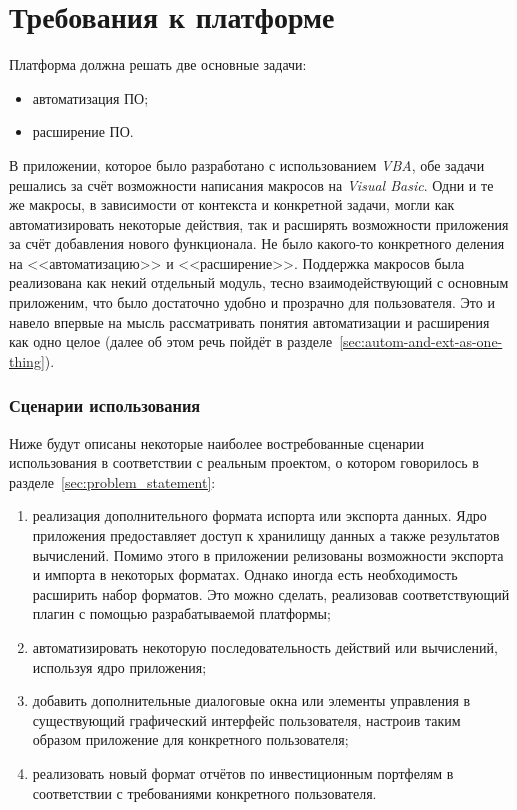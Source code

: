 \section{Требования к платформе}

Платформа должна решать две основные задачи:
\begin{itemize}
 \item автоматизация ПО;
 \item расширение ПО.
\end{itemize}

В приложении, которое было разработано с использованием {\it VBA}, обе задачи решались за счёт возможности написания макросов на {\it Visual Basic}. Одни и те же макросы, в зависимости от контекста и конкретной задачи, могли как автоматизировать некоторые действия, так и расширять возможности приложения за счёт добавления нового функционала. Не было какого-то конкретного деления на <<автоматизацию>> и <<расширение>>. Поддержка макросов была реализована как некий отдельный модуль, тесно взаимодействующий с основным приложеним, что было достаточно удобно и прозрачно для пользователя. Это и навело впервые на мысль рассматривать понятия автоматизации и расширения как одно целое (далее об этом речь пойдёт в разделе~\ref{sec:autom-and-ext-as-one-thing}).

\subsubsection{Сценарии использования}
Ниже будут описаны некоторые наиболее востребованные сценарии использования в соответствии с реальным проектом, о котором говорилось в разделе~\ref{sec:problem_statement}:
\begin{enumerate}
 \item реализация дополнительного формата испорта или экспорта данных. Ядро приложения предоставляет доступ к хранилищу данных а также результатов вычислений. Помимо этого в приложении релизованы возможности экспорта и импорта в некоторых форматах. Однако иногда есть необходимость расширить набор форматов. Это можно сделать, реализовав соответствующий плагин с помощью разрабатываемой платформы;
 \item автоматизировать некоторую последовательность действий или вычислений, используя ядро приложения;
 \item добавить дополнительные диалоговые окна или элементы управления в существующий графический интерфейс пользователя, настроив таким образом приложение для конкретного пользователя;
 \item реализовать новый формат отчётов по инвестиционным портфелям в соответствии с требованиями конкретного пользователя.
\end{enumerate}

